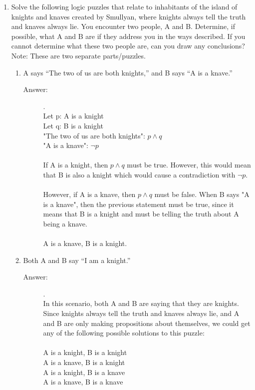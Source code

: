 \documentclass[12pt, oneside]{article}
\begin{document}
\begin{enumerate}
\item Solve the following logic puzzles that relate to inhabitants of the island of knights and knaves created by Smullyan, where knights always tell the truth and knaves always lie. You encounter two people, A and B. Determine, if possible, what A and B are if they address you in the ways described. If you cannot determine what these two people are, can you draw any conclusions? Note: These are two separate parts/puzzles.
\begin{enumerate}
    \item A says “The two of us are both knights,” and B says “A is a knave.”
    \begin{description}
        \item[Answer:] .\\
        Let p: A is a knight\\
        Let q: B is a knight\\
        "The two of us are both knights": $p \land q$\\
        "A is a knave": $\lnot p$\\\\
        If A is a knight, then $p \land q$ must be true. However, this would mean that B is also a knight which would cause a contradiction with $\lnot p$.\\\\
        However, if A is a knave, then $p \land q$ must be false. When B says "A is a knave", then the previous statement must be true, since it means that B is a knight and must be telling the truth about A being a knave.\\\\
        A is a knave, B is a knight.
    \end{description}
    \item Both A and B say “I am a knight.”
    \begin{description}
        \item[Answer:] .\\
        In this scenario, both A and B are saying that they are knights. Since knights always tell the truth and knaves always lie, and A and B are only making propositions about themselves, we could get any of the following possible solutions to this puzzle:\\\\
        A is a knight, B is a knight\\
        A is a knave, B is a knight\\
        A is a knight, B is a knave\\
        A is a knave, B is a knave
    \end{description}
\end{enumerate}


\end{enumerate}
\end{document}
